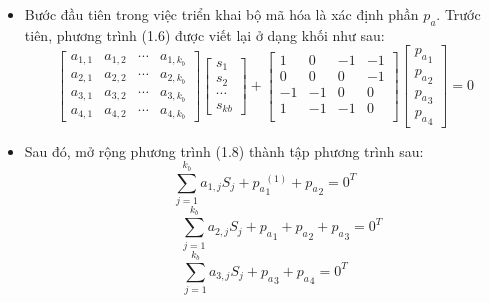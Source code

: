 \documentclass{article}
\begin{document}
\begin{itemize}
      \item 	Bước đầu tiên trong việc triển khai bộ mã hóa là xác định phần $p_a$. Trước tiên, phương trình (1.6) được viết lại ở dạng khối như sau:
        \begin{equation}\label{pt18}
          \begin{bmatrix}
            a_{1,1} & a_{1,2} & \cdots & a_{1,k_b} \\
            a_{2,1} & a_{2,2} & \cdots & a_{2,k_b} \\
            a_{3,1} & a_{3,2} & \cdots & a_{3,k_b} \\
            a_{4,1} & a_{4,2} & \cdots & a_{4,k_b} 
          \end{bmatrix}
          \begin{bmatrix}
             s_1 \\
             s_2 \\
             \cdots \\
             s_{kb} 
          \end{bmatrix}
           +  
           \begin{bmatrix}
            1 & 0 & -1 & -1 \\
            0 & 0 & 0 & -1 \\
            -1 & -1 & 0 & 0 \\
            1 & -1 & -1 & 0 \\
          \end{bmatrix}
          \begin{bmatrix}
           {p_a}_1 \\
           {p_a}_2\\
           {p_a}_3\\
           {p_a}_4 
          \end{bmatrix}
           = 0
      \end{equation}
      \item  Sau đó, mở rộng phương trình (1.8) thành tập phương trình sau:
      \begin{equation}\label{pt19}
         \displaystyle \sum_{j=1}^{k_b} a_{1,j}S_j + {p_a}_1 ^{(1)} + {p_a}_2 = 0^T
      \end{equation}
      \begin{equation}\label{pt120}
        \hspace{1cm}\displaystyle \sum_{j=1}^{k_b} a_{2,j}S_j + {p_a}_1 + {p_a}_2 + {p_a}_3= 0^T	
      \end{equation}
      \begin{equation}\label{pt121}
         \displaystyle \sum_{j=1}^{k_b} a_{3,j}S_j + {p_a}_3 + {p_a}_4 = 0^T	

\end{equation}
\end{itemize}
\end{document}
